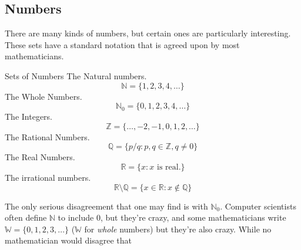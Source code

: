 \documentclass[crop=false,class=book,oneside]{standalone}
\begin{document}
        \subsection{Numbers}
            There are many kinds of numbers,
            but certain ones are particularly interesting.
            These sets have a standard notation
            that is agreed upon by most mathematicians.
            \begin{fnotation}{Sets of Numbers}{}
                The Natural numbers.
                \begin{equation*}
                    \mathbb{N}=
                    \{1,2,3,4,\hdots\}
                \end{equation*}
                The Whole Numbers.
                \begin{equation*}
                    \mathbb{N}_{0}=
                    \{0,1,2,3,4,\hdots\}
                \end{equation*}
                The Integers.
                \begin{equation*}
                    \mathbb{Z}=
                    \{\hdots,-2,-1,0,1,
                      2,\hdots\}
                \end{equation*}
                The Rational Numbers.
                \begin{equation*}
                    \mathbb{Q}=
                    \{p/q:
                      p,q\in\mathbb{Z},
                      q\ne{0}\}
                \end{equation*}
                The Real Numbers.
                \begin{equation*}
                    \mathbb{R}=
                    \{x:x\textrm{ is real.}\}
                \end{equation*}
                The irrational numbers.
                \begin{equation*}
                    \mathbb{R}\setminus\mathbb{Q}
                    =\{x\in\mathbb{R}:
                       x\notin\mathbb{Q}\}
                \end{equation*}
            \end{fnotation}
            The only serious disagreement that one may find
            is with $\mathbb{N}_{0}$. Computer scientists
            often define $\mathbb{N}$ to include $0$,
            but they're crazy, and some mathematicians write
            $\mathbb{W}=\{0,1,2,3,\hdots\}$
            ($\mathbb{W}$ for \textit{whole} numbers) but they're
            also crazy. While no mathematician would disagree that
\end{document}
